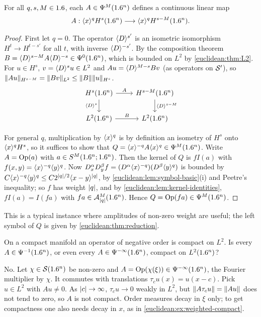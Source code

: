 \begin{theorem}\label{euclidean:thm:sobolev}
  For all $q,s,M\in1.6$, each $A\in\Psi^{M}(1.6^n)$ defines a continuous linear
  map
  \begin{equation*}
    A:\langle x\rangle^qH^s(1.6^n)\longrightarrow\langle x\rangle^qH^{s-M}(1.6^n).
  \end{equation*}
\end{theorem}
\begin{proof}
  First let $q=0$. The operator $\langle D\rangle^{s'}$ is an isometric isomorphism
  $H^{t}\to H^{t-s'}$ for all $t$, with inverse $\langle D\rangle^{-s'}$. By the
  composition theorem $B=\langle D\rangle^{s-M}A\langle D\rangle^{-s}\in\Psi^{0}(1.6^n)$, which is
  bounded on $L^2$ by \cref{euclidean:thm:L2}. For $u\in H^s$, $v=\langle D\rangle^su\in
  L^2$ and $Au=\langle D\rangle^{M-s}Bv$ (as operators on $\mathcal{S}'$), so
  $\lVert Au\rVert_{H^{s-M}}=\lVert Bv\rVert_{L^2}\le\lVert B\rVert\lVert u\rVert_{H^s}$.
  \[
  \begin{tikzcd}
    H^s(\R^n)\arrow[r,"A"]\arrow[d,"\ang D^s"'] & H^{s-M}(\R^n)\arrow[d,"\ang D^{s-M}"]\\
    L^2(\R^n)\arrow[r,"B"] & L^2(\R^n)
  \end{tikzcd}
  \]

  For general $q$, multiplication by $\langle x\rangle^{q}$ is by definition an isometry
  of $H^s$ onto $\langle x\rangle^qH^s$, so it suffices to show that
  $Q=\langle x\rangle^{-q}A\langle x\rangle^q\in\Psi^{M}(1.6^n)$. Write $A=\operatorname{Op}(a)$ with
  $a\in S^M(1.6^n;1.6^n)$. Then the kernel of $Q$ is $fI(a)$ with
  $f(x,y)=\langle x\rangle^{-q}\langle y\rangle^q$. Now
  $D^\alpha_xD^\beta_yf=(D^\alpha\langle x\rangle^{-q})(D^\beta\langle y\rangle^q)$ is bounded by
  $C\langle x\rangle^{-q}\langle y\rangle^q\le C2^{\lvert q\rvert/2}\langle x-y\rangle^{\lvert q\rvert}$, by
  \cref{euclidean:lem:symbol-basic}(i) and Peetre's inequality; so $f$ has weight
  $\lvert q\rvert$, and by \cref{euclidean:lem:kernel-identities},
  $fI(a)=I(fa)$ with $fa\in\mathcal{A}^{M}_{\lvert q\rvert}(1.6^n)$. Hence $Q=\operatorname{Op}(fa)\in\Psi^{M}(1.6^n)$.
\end{proof}

This is a typical instance where amplitudes of non-zero weight are useful;
the left symbol of $Q$ is given by \cref{euclidean:thm:reduction}.

\begin{question}
On a compact manifold an operator of negative order is compact on $L^2$. Is every
$A\in\Psi^{-1}(1.6^n)$, or even every $A\in\Psi^{-\infty}(1.6^n)$, compact on
$L^2(1.6^n)$?
\end{question}
\begin{answer}
No. Let $\chi\in\mathcal{S}(1.6^n)$ be non-zero and $A=\operatorname{Op}(\chi(\xi))\in\Psi^{-\infty}(1.6^n)$, the
Fourier multiplier by $\chi$. It commutes with translations $\tau_cu(x)=u(x-c)$. Pick
$u\in L^2$ with $Au\ne0$. As $\lvert c\rvert\to\infty$, $\tau_cu\to0$ weakly in $L^2$, but
$\lVert A\tau_cu\rVert=\lVert Au\rVert$ does not tend to zero, so $A$ is not compact. Order measures
decay in $\xi$ only; to get compactness one also needs decay in $x$, as in
\cref{euclidean:ex:weighted-compact}.
\end{answer}

